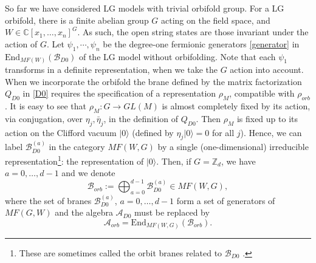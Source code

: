 \documentclass[a4paper,11pt]{article}
\numberwithin{equation}{section}
\begin{document}
So far we have considered LG models with trivial orbifold group. For a LG 
orbifold, there is a finite abelian group $G$ acting on the field space, and 
$W\in\mathbb{C}[x_{1},\ldots,x_{n}]^{G}$. As such, the open string states are 
those invariant under the action of $G$. Let $\psi_1,\cdots,\psi_n$ be the 
degree-one fermionic generators \eqref{generator} in 
$\mathrm{End}_{MF(W)}(\mathcal{B}_{D0})$ of the LG model without orbifolding. 
Note that each $\psi_1$ transforms in a definite representation, when we take 
the $G$ action into account. When we incorporate the orbifold the brane defined 
by the matrix factorization $Q_{D0}$ in \eqref{D0} requires the 
specification of a representation $\rho_{M}$, compatible with $\rho_{orb}$. It 
is easy to see that $\rho_{M}:G\rightarrow GL(M)$ is almost completely fixed by 
its action, via conjugation, over $\eta_{j},\bar{\eta}_{j}$, in the definition 
of $Q_{D0}$. Then $\rho_{M}$ is fixed up to its action on the Clifford 
vacuum $|0\rangle$ (defined by $\eta_{j}|0\rangle=0$ for all $j$). Hence, 
we can label $\mathcal{B}_{D0}^{(a)}$ in the category $MF(W,G)$ by a single 
(one-dimensional) irreducible representation\footnote{These are sometimes 
called the orbit branes related to $\mathcal{B}_{D0}$ 
\cite{Ashok:2004zb,Jockers:2006sm}.}: the representation of $|0\rangle$. Then, 
if $G=\mathbb{Z}_{d}$, we have $a=0,\ldots,d-1$ and we denote 
\begin{equation}\label{tiltingorb}
\mathcal{B}_{orb}:=\bigoplus_{a=0}^{d-1}\mathcal{B}_{D0}^{(a)}\in MF(W,G),
\end{equation}
where the set of branes $\mathcal{B}_{D0}^{(a)}$, $a=0,\ldots,d-1$ form a set 
of 
generators of $MF(G,W)$ \cite{tu2014matrix} and the algebra $\mathcal{A}_{D0}$ 
must be replaced by
\begin{equation}
\mathcal{A}_{orb}=\mathrm{End}_{MF(W,G)}(\mathcal{B}_{orb}).
\end{equation}
\end{document}
